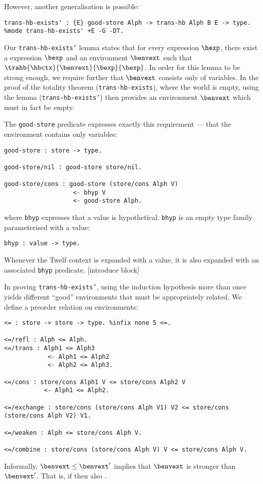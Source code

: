 However, another generalisation is possible:
\begin{verbatim}
trans-hb-exists' : {E} good-store Alph -> trans-hb Alph B E -> type.
%mode trans-hb-exists' +E -G -DT.
\end{verbatim}
Our \texttt{trans-hb-exists'} lemma states that for every \hlang expression $\hexp$, there exist a \blang expression $\bexp$ and an environment $\benvext$ such that $\trahb{\hbctx}{\benvext}{\bexp}{\hexp}$.
In order for this lemma to be strong enough, we require further that $\benvext$ consists only of variables.
In the proof of the totality theorem (\texttt{trans-hb-exists}), where the world is empty, using the lemma (\texttt{trans-hb-exists'}) then provides an environment $\benvext$ which must in fact be empty.

The \texttt{good-store} predicate expresses exactly this requirement --- that the environment contains only variables:
\begin{verbatim}
good-store : store -> type.

good-store/nil : good-store store/nil.

good-store/cons : good-store (store/cons Alph V)
                   <- bhyp V
                   <- good-store Alph.
\end{verbatim}
where \texttt{bhyp} expresses that a value is hypothetical.
\texttt{bhyp} is an empty type family parameterised with a \blang value:
\begin{verbatim}
bhyp : value -> type.
\end{verbatim}
Whenever the Twelf context is expanded with a value, it is also expanded with an associated \texttt{bhyp} predicate.
[introduce block]

In proving \texttt{trans-hb-exists'}, using the induction hypothesis more than once yields different ``good'' environments that must be appropriately related.
We define a preorder relation on environments:
\begin{verbatim}
<= : store -> store -> type. %infix none 5 <=.

<=/refl : Alph <= Alph.
<=/trans : Alph1 <= Alph3
            <- Alph1 <= Alph2
            <- Alph2 <= Alph3.

<=/cons : store/cons Alph1 V <= store/cons Alph2 V
           <- Alph1 <= Alph2.

<=/exchange : store/cons (store/cons Alph V1) V2 <= store/cons (store/cons Alph V2) V1.

<=/weaken : Alph <= store/cons Alph V.

<=/combine : store/cons (store/cons Alph V) V <= store/cons Alph V.
\end{verbatim}
Informally, $\benvext \leq \benvext'$ implies that $\benvext$ is stronger than $\benvext'$.
That is, if \trahb{}{\benvext}{\bexp}{\hexp} then also .

